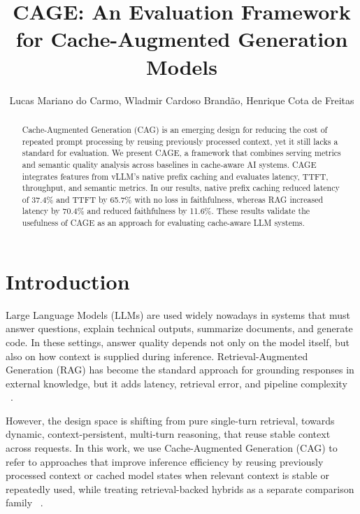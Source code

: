 \documentclass[12pt,a4paper]{article}
\title{CAGE: An Evaluation Framework for Cache-Augmented Generation Models}
\author{Lucas Mariano do Carmo\inst{1}, Wladmir Cardoso Brandão\inst{1}, Henrique Cota de Freitas\inst{1}}
\date{}
\let\cite\citep
\begin{document}
\singlespacing
\maketitle
\begin{abstract}
Cache-Augmented Generation (CAG) is an emerging design for reducing the cost of repeated prompt processing by reusing previously processed context, yet it still lacks a standard for evaluation.
We present CAGE, a framework that combines serving metrics and semantic quality analysis across baselines in cache-aware AI systems. CAGE integrates features from vLLM’s native prefix caching and evaluates latency, TTFT, throughput, and semantic metrics. In our results, native prefix caching reduced latency of 37.4\% and TTFT by 65.7\% with no loss in faithfulness, whereas RAG increased latency by 70.4\% and reduced faithfulness by 11.6\%. These results validate the usefulness of CAGE as an approach for evaluating cache-aware LLM systems.
\end{abstract}


\section{Introduction}

Large Language Models (LLMs) are used widely nowadays in systems that must answer questions, explain technical outputs, summarize documents, and generate code. In these settings, answer quality depends not only on the model itself, but also on how context is supplied during inference. Retrieval-Augmented Generation (RAG) has become the standard approach for grounding responses in external knowledge, but it adds latency, retrieval error, and pipeline complexity ~\cite{lewis2020retrieval}.

However, the design space is shifting from pure single-turn retrieval, towards dynamic, context-persistent, multi-turn reasoning, that reuse stable context across requests. In this work, we use Cache-Augmented Generation (CAG) to refer to approaches that improve inference efficiency by reusing previously processed context or cached model states when relevant context is stable or repeatedly used, while treating retrieval-backed hybrids as a separate comparison family ~\cite{yu2024dontdorag, chen2024turborag}.
\end{document}
